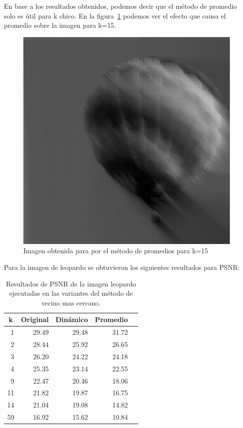 \documentclass[a4paper]{article}
\newcounter{col}
\begin{document}
En base a los resultados obtenidos, podemos decir que el método de promedio solo es útil para k chico. En la figura~\ref{globoProm} podemos ver el efecto que causa el promedio sobre la imagen para k=15.

\begin{figure}[H]
\centering
\includegraphics[scale=0.15]{imagenes/globok15.png}
\caption{Imagen obtenida para por el método de promedios para k=15}
\label{globoProm}
\end{figure}


Para la imagen de leopardo se obtuvieron los siguientes resultados para PSNR:


\begin{table}[H]
\centering
\begin{tabular}{|r|r|r|r|r|}
\hline
\multicolumn{1}{|c|}{k} & \multicolumn{1}{c|}{Original} & \multicolumn{1}{c|}{Dinámico} & \multicolumn{1}{c|}{Promedio} \\ \hline
1 & 29.49 & 29.48& 31.72 \\ \hline
2 & 28.44 &  25.92 & 26.65 \\ \hline
3 & 26.20 &  24.22 & 24.18 \\ \hline
4 &25.35&  23.14 &  22.55 \\ \hline
9 & 22.47 & 20.46& 18.06 \\ \hline
11 & 21.82 &   19.87 & 16.75 \\ \hline
14 & 21.04 &  19.08 &  14.82 \\ \hline
59 &16.92&  15.62 & 10.84 \\ \hline
\end{tabular}
\caption{Resultados de PSNR de la imagen leopardo ejecutadas en las variantes del m\'etodo de vecino mas cercano.}
\label{}
\end{table}
\end{document}
